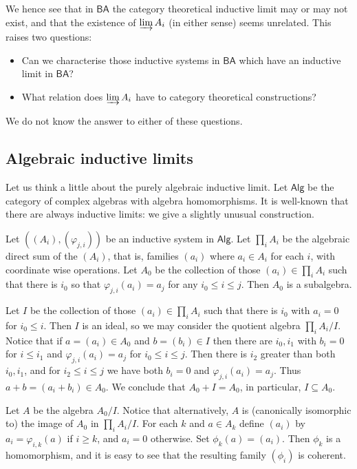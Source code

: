 \documentclass[a4paper,11pt]{article}
\newcommand{\indlim}{\varinjlim}
\newcommand{\ba}{\textsf{BA}}
\theoremstyle{definition}
\begin{document}
We hence see that in $\ba$ the category theoretical inductive limit may or may not exist, and
that the existence of $\indlim A_i$ (in either sense) seems unrelated.  This raises two questions:
\begin{itemize}
\item Can we characterise those inductive systems in $\ba$ which have an inductive limit in $\ba$?
\item What relation does $\indlim A_i$ have to category theoretical constructions?
\end{itemize}
We do not know the answer to either of these questions.



\subsection{Algebraic inductive limits}

Let us think a little about the purely algebraic inductive limit.  Let $\textsf{Alg}$ be the
category of complex algebras with algebra homomorphisms.  It is well-known that there are always
inductive limits: we give a slightly unusual construction.

Let $((A_i), (\varphi_{j,i}))$ be an inductive system in $\textsf{Alg}$.  Let $\prod_i A_i$ be the
algebraic direct sum of the $(A_i)$, that is, families $(a_i)$ where $a_i\in A_i$ for each $i$,
with coordinate wise operations.  Let $A_0$ be the collection of those $(a_i)\in \prod_i A_i$ such
that there is $i_0$ so that $\varphi_{j,i}(a_i) = a_j$ for any $i_0\leq i\leq j$.  Then $A_0$ is
a subalgebra.

Let $I$ be the collection of those $(a_i) \in \prod_i A_i$ such that there is $i_0$ with $a_i=0$
for $i_0 \leq i$.  Then $I$ is an ideal, so we may consider the quotient algebra $\prod_i A_i / I$.
Notice that if $a=(a_i)\in A_0$ and $b=(b_i)\in I$ then there are $i_0,i_1$ with $b_i=0$ for
$i\leq i_1$ and $\varphi_{j,i}(a_i) = a_j$ for $i_0 \leq i \leq j$.  Then there is $i_2$ greater
than both $i_0, i_1$, and for $i_2 \leq i \leq j$ we have both $b_i=0$ and $\varphi_{j,i}(a_i) =
a_j$.  Thus $a+b = (a_i+b_i)\in A_0$.  We conclude that $A_0 + I = A_0$, in particular,
$I\subseteq A_0$.

Let $A$ be the algebra $A_0 / I$.  Notice that alternatively, $A$ is (canonically isomorphic to)
the image of $A_0$ in $\prod_i A_i / I$.  For each $k$ and $a\in A_k$ define $(a_i)$ by $a_i
= \varphi_{i,k}(a)$ if $i\geq k$, and $a_i=0$ otherwise.  Set $\phi_k(a) = (a_i)$.  Then $\phi_k$
is a homomorphism, and it is easy to see that the resulting family $(\phi_i)$ is coherent.
\end{document}
